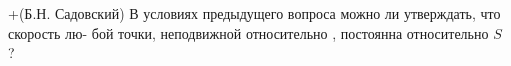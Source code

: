 +(Б.Н. Садовский)
В условиях предыдущего вопроса можно ли утверждать, что скорость лю-
бой точки, неподвижной относительно  , постоянна относительно $S$ ?

